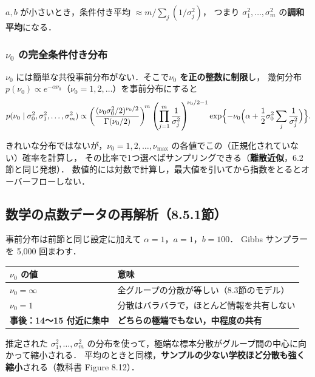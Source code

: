 \documentclass[lualatex,ja=standard,a4paper,12pt]{bxjsarticle}
\begin{document}
\noindent $a, b$ が小さいとき，条件付き平均 $\approx m / \sum_j (1/\sigma_j^2)$，
つまり $\sigma_1^2, \ldots, \sigma_m^2$ の\textbf{調和平均}になる．

\subsubsection*{$\nu_0$ の完全条件付き分布}

$\nu_0$ には簡単な共役事前分布がない．そこで\textbf{$\nu_0$ を正の整数に制限}し，
幾何分布 $p(\nu_0) \propto e^{-\alpha\nu_0}$（$\nu_0 = 1, 2, \ldots$）を事前分布にすると
\[
  p(\nu_0 \mid \sigma_0^2, \sigma_1^2, \ldots, \sigma_m^2) \propto
  \left(\frac{(\nu_0\sigma_0^2/2)^{\nu_0/2}}{\Gamma(\nu_0/2)}\right)^{\!m}
  \left(\prod_{j=1}^m \frac{1}{\sigma_j^2}\right)^{\!\nu_0/2 - 1}
  \exp\Bigl\{-\nu_0\Bigl(\alpha + \frac12\sigma_0^2\sum_j \frac{1}{\sigma_j^2}\Bigr)\Bigr\}.
\]

\begin{pointbox}
きれいな分布ではないが，$\nu_0 = 1, 2, \ldots, \nu_{\max}$ の各値でこの（正規化されていない）確率を計算し，
その比率で1つ選べばサンプリングできる（\textbf{離散近似}，6.2節と同じ発想）．
数値的には対数で計算し，最大値を引いてから指数をとるとオーバーフローしない．
\end{pointbox}

\subsection{数学の点数データの再解析（8.5.1節）}

事前分布は前節と同じ設定に加えて $\alpha = 1$，$a = 1$，$b = 100$．
Gibbs サンプラーを 5,000 回まわす．

\begin{center}
\renewcommand{\arraystretch}{1.5}
\begin{tabular}{ll}
\toprule
$\nu_0$ の値 & 意味 \\
\midrule
$\nu_0 = \infty$ & 全グループの分散が等しい（8.3節のモデル） \\
$\nu_0 = 1$ & 分散はバラバラで，ほとんど情報を共有しない \\
\textbf{事後：14〜15 付近に集中} & \textbf{どちらの極端でもない，中程度の共有} \\
\bottomrule
\end{tabular}
\end{center}

\noindent 推定された $\sigma_1^2, \ldots, \sigma_m^2$ の分布を使って，極端な標本分散がグループ間の中心に向かって縮小される．
平均のときと同様，\textbf{サンプルの少ない学校ほど分散も強く縮小}される（教科書 Figure 8.12）．
\end{document}
